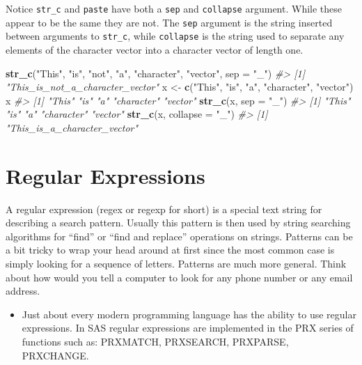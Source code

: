 \documentclass[]{book}
\newenvironment{Shaded}{\begin{snugshade}}{\end{snugshade}}
\newcommand{\KeywordTok}[1]{\textcolor[rgb]{0.13,0.29,0.53}{\textbf{#1}}}
\newcommand{\DataTypeTok}[1]{\textcolor[rgb]{0.13,0.29,0.53}{#1}}
\newcommand{\StringTok}[1]{\textcolor[rgb]{0.31,0.60,0.02}{#1}}
\newcommand{\CommentTok}[1]{\textcolor[rgb]{0.56,0.35,0.01}{\textit{#1}}}
\newcommand{\NormalTok}[1]{#1}
\newenvironment{rmdblock}[1]
  {\begin{shaded*}
  \begin{itemize}
  \renewcommand{\labelitemi}{
    \raisebox{-.7\height}[0pt][0pt]{
      {\setkeys{Gin}{width=3em,keepaspectratio}\texttt{[image: images/\#1]}}
    }
  }
  \item
  }
  {
  \end{itemize}
  \end{shaded*}
  }
\newenvironment{rmdnote}
  {\begin{rmdblock}{note}}
  {\end{rmdblock}}
\begin{document}
Notice \texttt{str\_c} and \texttt{paste} have both a \texttt{sep} and
\texttt{collapse} argument. While these appear to be the same they are
not. The \texttt{sep} argument is the string inserted between arguments
to \texttt{str\_c}, while \texttt{collapse} is the string used to
separate any elements of the character vector into a character vector of
length one.

\begin{Shaded}
\begin{Highlighting}[]
\KeywordTok{str_c}\NormalTok{(}\StringTok{"This"}\NormalTok{, }\StringTok{"is"}\NormalTok{, }\StringTok{"not"}\NormalTok{, }\StringTok{"a"}\NormalTok{, }\StringTok{"character"}\NormalTok{, }\StringTok{"vector"}\NormalTok{, }\DataTypeTok{sep =} \StringTok{"_"}\NormalTok{)}
\CommentTok{#> [1] "This_is_not_a_character_vector"}
\NormalTok{x <-}\StringTok{ }\KeywordTok{c}\NormalTok{(}\StringTok{"This"}\NormalTok{, }\StringTok{"is"}\NormalTok{, }\StringTok{"a"}\NormalTok{, }\StringTok{"character"}\NormalTok{, }\StringTok{"vector"}\NormalTok{)}
\NormalTok{x}
\CommentTok{#> [1] "This"      "is"        "a"         "character" "vector"}
\KeywordTok{str_c}\NormalTok{(x, }\DataTypeTok{sep =} \StringTok{"_"}\NormalTok{)}
\CommentTok{#> [1] "This"      "is"        "a"         "character" "vector"}
\KeywordTok{str_c}\NormalTok{(x, }\DataTypeTok{collapse =} \StringTok{"_"}\NormalTok{)}
\CommentTok{#> [1] "This_is_a_character_vector"}
\end{Highlighting}
\end{Shaded}

\section{Regular Expressions}\label{regular-expressions}

A regular expression (regex or regexp for short) is a special text
string for describing a search pattern. Usually this pattern is then
used by string searching algorithms for ``find'' or ``find and replace''
operations on strings. Patterns can be a bit tricky to wrap your head
around at first since the most common case is simply looking for a
sequence of letters. Patterns are much more general. Think about how
would you tell a computer to look for any phone number or any email
address.

\begin{rmdnote}
Just about every modern programming language has the ability to use
regular expressions. In SAS regular expressions are implemented in the
PRX series of functions such as: PRXMATCH, PRXSEARCH, PRXPARSE,
PRXCHANGE.
\end{rmdnote}
\end{document}
